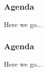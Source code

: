 \documentclass{beamer}
\begin{document}
{
\begin{frame}
  \frametitle{Agenda}
  Here we go...
\end{frame}
}

{
\begin{frame}[plain]
  \frametitle{Agenda}
  Here we go...
\end{frame}
}
\end{document}
